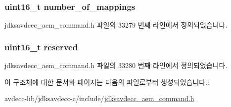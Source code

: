 \subsubsection[{\texorpdfstring{number\+\_\+of\+\_\+mappings}{number_of_mappings}}]{\setlength{\rightskip}{0pt plus 5cm}uint16\+\_\+t number\+\_\+of\+\_\+mappings}\hypertarget{structjdksavdecc__aem__command__remove__sensor__mappings__response_ac7db472c5622ef473d5d0a5c416d5531}{}\label{structjdksavdecc__aem__command__remove__sensor__mappings__response_ac7db472c5622ef473d5d0a5c416d5531}


jdksavdecc\+\_\+aem\+\_\+command.\+h 파일의 33279 번째 라인에서 정의되었습니다.

\subsubsection[{\texorpdfstring{reserved}{reserved}}]{\setlength{\rightskip}{0pt plus 5cm}uint16\+\_\+t reserved}\hypertarget{structjdksavdecc__aem__command__remove__sensor__mappings__response_a5a6ed8c04a3db86066924b1a1bf4dad3}{}\label{structjdksavdecc__aem__command__remove__sensor__mappings__response_a5a6ed8c04a3db86066924b1a1bf4dad3}


jdksavdecc\+\_\+aem\+\_\+command.\+h 파일의 33280 번째 라인에서 정의되었습니다.



이 구조체에 대한 문서화 페이지는 다음의 파일로부터 생성되었습니다.\+:\begin{DoxyCompactItemize}
\item 
avdecc-\/lib/jdksavdecc-\/c/include/\hyperlink{jdksavdecc__aem__command_8h}{jdksavdecc\+\_\+aem\+\_\+command.\+h}\end{DoxyCompactItemize}
